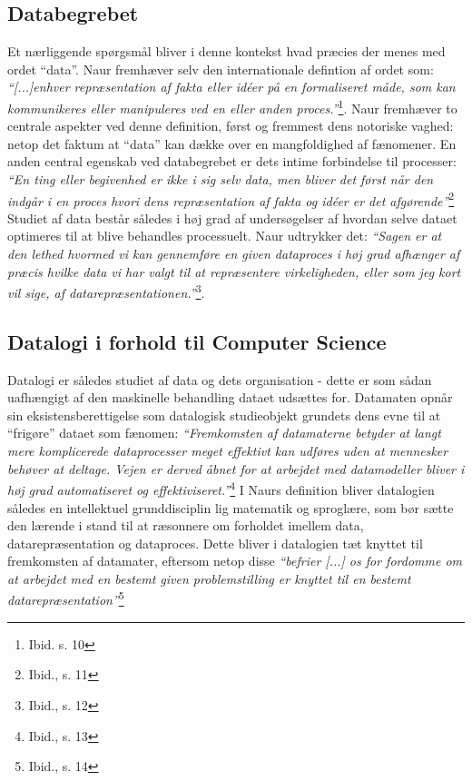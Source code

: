 \documentclass[10pt,a4paper]{article}
\newcommand{\citat}[2]{\vspace{0.1cm}\newline\textit{``#1''}\hspace{0.1cm}\footnote{#2}\vspace{0.1cm}\newline}
\begin{document}
\subsection{Databegrebet}
Et nærliggende spørgsmål bliver i denne kontekst hvad præcies der menes med
ordet ``data''. Naur fremhæver selv den internationale defintion af ordet som:
\citat{[...]enhver repræsentation af fakta eller idéer på en formaliseret måde, som
kan kommunikeres eller manipuleres ved en eller anden proces.}{Ibid. s. 10}.
Naur fremhæver to centrale aspekter ved denne definition, først og fremmest
dens notoriske vaghed: netop det faktum at ``data'' kan dække over en
mangfoldighed af fænomener. En anden central egenskab ved databegrebet er dets 
intime forbindelse til processer: \citat{En ting eller begivenhed er ikke i sig 
selv data, men bliver det først når den indgår i en proces hvori dens repræsentation 
af fakta og idéer er det afgørende}{Ibid., s. 11} Studiet af data består således i
høj grad af undersøgelser af hvordan selve dataet optimeres til at blive behandles
processuelt. Naur udtrykker det: \citat{Sagen er at den lethed 
hvormed vi kan gennemføre en given dataproces i høj grad afhænger af præcis hvilke
data vi har valgt til at repræsentere virkeligheden, eller som jeg kort vil sige,
af \emph{datarepræsentationen}.}{Ibid., s. 12}. 

\subsection{Datalogi i forhold til Computer Science}
Datalogi er således studiet af data og dets organisation - dette er som sådan 
uafhængigt af den maskinelle behandling dataet udsættes for. Datamaten opnår sin 
eksistensberettigelse som datalogisk studieobjekt grundets dens evne til at 
``frigøre'' dataet som fænomen: \citat{Fremkomsten af datamaterne
betyder at langt mere komplicerede dataprocesser meget effektivt kan udføres
uden at mennesker behøver at deltage. Vejen er derved åbnet for at arbejdet
med datamodeller bliver i høj grad automatiseret og effektiviseret.}{Ibid., s. 13}
I Naurs definition bliver datalogien således en intellektuel grunddisciplin 
lig matematik og sproglære, som bør sætte den lærende i stand til at 
ræsonnere om forholdet imellem data, datarepræsentation og dataproces. 
Dette bliver i datalogien tæt knyttet til fremkomsten af datamater, eftersom 
netop disse \citat{befrier [...] os for fordomme om at arbejdet med en bestemt given
problemstilling er knyttet til en bestemt datarepræsentation}{Ibid., s. 14} 
\end{document}
